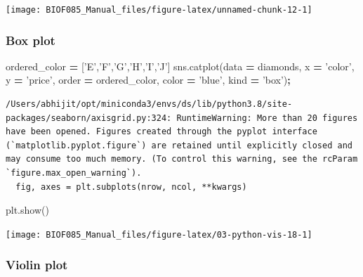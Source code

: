 \documentclass[
  letterpaper,
]{scrbook}
\newenvironment{Shaded}{\begin{snugshade}}{\end{snugshade}}
\newcommand{\NormalTok}[1]{#1}
\newcommand{\OperatorTok}[1]{\textcolor[rgb]{0.81,0.36,0.00}{\textbf{#1}}}
\newcommand{\StringTok}[1]{\textcolor[rgb]{0.31,0.60,0.02}{#1}}
\begin{document}
\begin{center}\texttt{[image: BIOF085\_Manual\_files/figure-latex/unnamed-chunk-12-1]} \end{center}

\hypertarget{box-plot-1}{%
\subsubsection{Box plot}\label{box-plot-1}}

\begin{Shaded}
\begin{Highlighting}[]
\NormalTok{ordered_color }\OperatorTok{=}\NormalTok{ [}\StringTok{'E'}\NormalTok{,}\StringTok{'F'}\NormalTok{,}\StringTok{'G'}\NormalTok{,}\StringTok{'H'}\NormalTok{,}\StringTok{'I'}\NormalTok{,}\StringTok{'J'}\NormalTok{]}
\NormalTok{sns.catplot(data }\OperatorTok{=}\NormalTok{ diamonds, x }\OperatorTok{=} \StringTok{'color'}\NormalTok{, y }\OperatorTok{=} \StringTok{'price'}\NormalTok{, }
\NormalTok{            order }\OperatorTok{=}\NormalTok{ ordered_color, color }\OperatorTok{=} \StringTok{'blue'}\NormalTok{, kind }\OperatorTok{=} \StringTok{'box'}\NormalTok{)}\OperatorTok{;}
\end{Highlighting}
\end{Shaded}

\begin{verbatim}
/Users/abhijit/opt/miniconda3/envs/ds/lib/python3.8/site-packages/seaborn/axisgrid.py:324: RuntimeWarning: More than 20 figures have been opened. Figures created through the pyplot interface (`matplotlib.pyplot.figure`) are retained until explicitly closed and may consume too much memory. (To control this warning, see the rcParam `figure.max_open_warning`).
  fig, axes = plt.subplots(nrow, ncol, **kwargs)
\end{verbatim}

\begin{Shaded}
\begin{Highlighting}[]
\NormalTok{plt.show()}
\end{Highlighting}
\end{Shaded}

\begin{center}\texttt{[image: BIOF085\_Manual\_files/figure-latex/03-python-vis-18-1]} \end{center}

\hypertarget{violin-plot}{%
\subsubsection{Violin plot}\label{violin-plot}}
\end{document}
